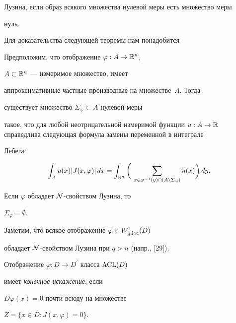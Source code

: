 Лузина, если образ всякого множества нулевой меры есть множество меры


нуль.





Для доказательства следующей теоремы нам понадобится





\begin{prop}


Предположим, что отображение $\varphi:A\to{\Bbb R}^n$,


$A\subset{\Bbb R}^n$ --- измеримое множество, имеет


аппроксимативные частные производные на множестве~$A$. Тогда


существует множество $\Sigma_{\varphi}\subset A$ нулевой меры


такое, что для любой неотрицательной измеримой функции $u:A\to{\Bbb


R}$ справедлива следующая формула замены переменной в интеграле


Лебега\/${:}$


\begin{equation}


\int_Au(x)|J(x,\varphi)|\,dx= \int_{{\Bbb


R^n}}\bigg(\, \sum\limits_{x\in


\varphi^{-1}(y)\cap(A\setminus\Sigma_{\varphi})}u(x)\bigg)\,dy.


\end{equation}


Если $\varphi$ обладает $\cal N$-свойством Лузина, то


$\Sigma_{\varphi}=\emptyset$.


\end{prop}





Заметим, что всякое отображение $\varphi\in W^1_{q,\operatorname{loc}}(D)$


обладает $\cal N$-свойством Лузина при $q>n$ (напр., [29]).





Отображение $\varphi : D\to D^{\prime}$ класса $\operatorname{ACL}(D)$


имеет {\it конечное искажение}, если


$D\varphi(x)=0$ почти всюду на множестве


$Z=\{x\in D:J(x,\varphi)=0\}$.






